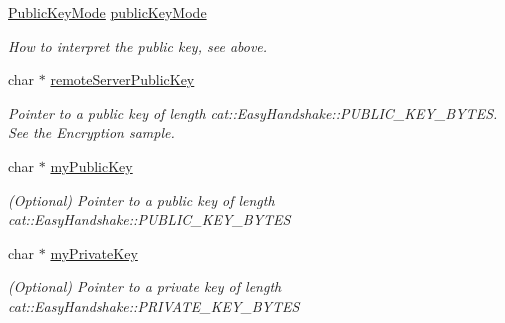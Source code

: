 \begin{DoxyCompactItemize}
\item 
\hypertarget{struct_rak_net_1_1_public_key_adb74cd6413049125b4d856fd0fdd5020}{\hyperlink{namespace_rak_net_a415b479158fd361610df230a53b35b02}{Public\-Key\-Mode} \hyperlink{struct_rak_net_1_1_public_key_adb74cd6413049125b4d856fd0fdd5020}{public\-Key\-Mode}}\label{struct_rak_net_1_1_public_key_adb74cd6413049125b4d856fd0fdd5020}

\begin{DoxyCompactList}\small\item\em How to interpret the public key, see above. \end{DoxyCompactList}\item 
\hypertarget{struct_rak_net_1_1_public_key_a0a916a5ef434100665be009fd4814f69}{char $\ast$ \hyperlink{struct_rak_net_1_1_public_key_a0a916a5ef434100665be009fd4814f69}{remote\-Server\-Public\-Key}}\label{struct_rak_net_1_1_public_key_a0a916a5ef434100665be009fd4814f69}

\begin{DoxyCompactList}\small\item\em Pointer to a public key of length cat\-::\-Easy\-Handshake\-::\-P\-U\-B\-L\-I\-C\-\_\-\-K\-E\-Y\-\_\-\-B\-Y\-T\-E\-S. See the Encryption sample. \end{DoxyCompactList}\item 
\hypertarget{struct_rak_net_1_1_public_key_a617f75bd0fc9dd672d167732033a15ce}{char $\ast$ \hyperlink{struct_rak_net_1_1_public_key_a617f75bd0fc9dd672d167732033a15ce}{my\-Public\-Key}}\label{struct_rak_net_1_1_public_key_a617f75bd0fc9dd672d167732033a15ce}

\begin{DoxyCompactList}\small\item\em (Optional) Pointer to a public key of length cat\-::\-Easy\-Handshake\-::\-P\-U\-B\-L\-I\-C\-\_\-\-K\-E\-Y\-\_\-\-B\-Y\-T\-E\-S \end{DoxyCompactList}\item 
\hypertarget{struct_rak_net_1_1_public_key_a6b639f1e4cd593c3fb5432277f373fa3}{char $\ast$ \hyperlink{struct_rak_net_1_1_public_key_a6b639f1e4cd593c3fb5432277f373fa3}{my\-Private\-Key}}\label{struct_rak_net_1_1_public_key_a6b639f1e4cd593c3fb5432277f373fa3}

\begin{DoxyCompactList}\small\item\em (Optional) Pointer to a private key of length cat\-::\-Easy\-Handshake\-::\-P\-R\-I\-V\-A\-T\-E\-\_\-\-K\-E\-Y\-\_\-\-B\-Y\-T\-E\-S \end{DoxyCompactList}\end{DoxyCompactItemize}


